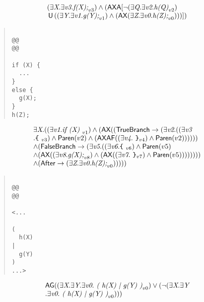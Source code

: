 \documentclass{article}
\newcommand{\U}{\,\mbox{\sf{U}}\,}
\newcommand{\A}{\mbox{\sf{A}}}
\newcommand{\AX}{\mbox{\sf{AX}}}
\newcommand{\AF}{\mbox{\sf{AF}}}
\newcommand{\AG}{\mbox{\sf{AG}}}
\newcommand{\mita}[1]{\mbox{\it{{#1}}}}
\newcommand{\msf}[1]{\mbox{\sf{{#1}}}}
\newcommand{\ttlb}{\mbox{\tt \char'173}}
\newcommand{\ttrb}{\mbox{\tt \char'175}}
\begin{document}
\[\begin{array}{l}
(\exists \mita{X} . \exists \mita{v3} . \mita{f(X);}_{v3}) \wedge (\AX\A[\neg (\exists \mita{Q} . \exists \mita{v2} . \mita{h(Q)}_{v2})\\ \U ((\exists \mita{Y} . \exists \mita{v1} . \mita{g(Y);}_{v1}) \wedge (\AX(\exists \mita{Z} . \exists \mita{v0} . \mita{h(Z);}_{v0})))]
)
\end{array}\]

\begin{quote}\begin{verbatim}

@@
@@

if (X) {
  ...
}
else {
  g(X);
}
h(Z);
\end{verbatim}\end{quote}

\[\begin{array}{l}
\exists \mita{X} . ((\exists \mita{v1} . \mita{if (X) }_{v1}) \wedge (\AX((\msf{TrueBranch} \rightarrow (\exists \mita{v2} . ((\exists \mita{v3}\\ . \mita{{\ttlb}
  }_{v3}) \wedge \msf{Paren}(v2) \wedge (\AX\AF((\exists \mita{v4} . \mita{
{\ttrb}}_{v4}) \wedge \msf{Paren}(v2))))))\\ \wedge (\msf{FalseBranch} \rightarrow (\exists \mita{v5} . ((\exists \mita{v6} . \mita{{\ttlb}
  }_{v6}) \wedge \msf{Paren}(v5)\\ \wedge (\AX((\exists \mita{v8} . \mita{g(X);}_{v8}) \wedge (\AX((\exists \mita{v7} . \mita{
{\ttrb}}_{v7}) \wedge \msf{Paren}(v5))))))))\\ \wedge (\msf{After} \rightarrow (\exists \mita{Z} . \exists \mita{v0} . \mita{h(Z);}_{v0})))))
\end{array}\]

\begin{quote}\begin{verbatim}

@@
@@

<...
  
(
  h(X)
|
  g(Y)
)
...>
\end{verbatim}\end{quote}

\[\begin{array}{l}
\AG((\exists \mita{X} . \exists \mita{Y} . \exists \mita{v0} . \mita{
(
h(X)
|
g(Y)
)}_{v0}) \vee (\neg (\exists \mita{X} . \exists \mita{Y}\\ . \exists \mita{v0} . \mita{
(
h(X)
|
g(Y)
)}_{v0})))
\end{array}\]
\end{document}
